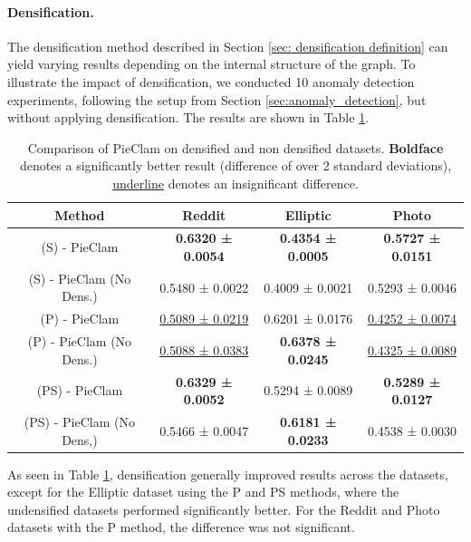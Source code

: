 \documentclass[letterpaper]{article} %
\begin{document}
\paragraph{Densification.}
\label{sec:ablation densification}
The densification method described in Section \ref{sec: densification definition} can yield varying results depending on the internal structure of the graph. To illustrate the impact of densification, we conducted 10 anomaly detection experiments, following the setup from Section \ref{sec:anomaly_detection}, but without applying densification. The results are shown in Table \ref{TableAblation}.
\begin{table}[H]
\centering
\small
\begin{tabular}{|c|c|c|c|}
    \hline
  Method  & Reddit & Elliptic & Photo \\
    \hline
  (S) - PieClam & \textbf{0.6320 ± 0.0054} & \textbf{0.4354 ± 0.0005} & \textbf{0.5727 ± 0.0151} \\
  (S) - PieClam (No Dens.) & 0.5480 ± 0.0022 & 0.4009 ± 0.0021& 0.5293 ± 0.0046\\
\hline
  (P) - PieClam & \underline{0.5089 ± 0.0219} & 0.6201 ± 0.0176 & \underline{0.4252 ± 0.0074} \\
  (P) - PieClam (No Dens.) & \underline{0.5088 ± 0.0383}& \textbf{0.6378 ± 0.0245}& \underline{0.4325 ± 0.0089}\\
    \hline
  
  (PS) - PieClam & \textbf{0.6329 ± 0.0052} & 0.5294 ± 0.0089 & \textbf{0.5289 ± 0.0127} \\
  (PS) - PieClam (No Dens,) & 0.5466 ± 0.0047& \textbf{0.6181 ± 0.0233}& 0.4538 ± 0.0030\\
    \hline
\end{tabular}
\caption{Comparison of PieClam on densified and non densified datasets. \textbf{Boldface} denotes a significantly better result (difference of over 2 standard deviations), \underline{underline} denotes an insignificant difference.}
\label{TableAblation}
\end{table}

As seen in Table \ref{TableAblation}, densification generally improved results across the datasets, except for the Elliptic dataset using the P and PS methods, where the undensified datasets performed significantly better. For the Reddit and Photo datasets with the P method, the difference was not significant.

\end{document}
